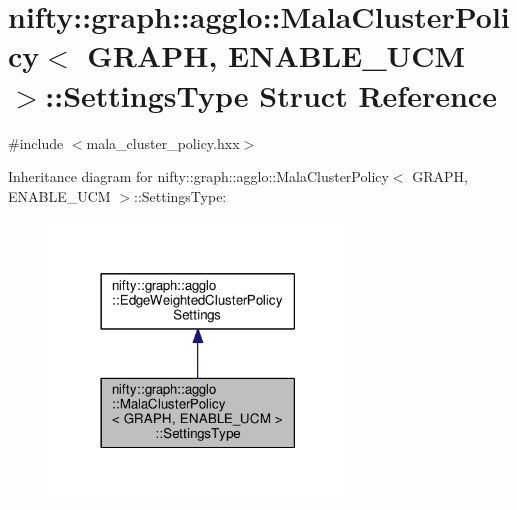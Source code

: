 \hypertarget{structnifty_1_1graph_1_1agglo_1_1MalaClusterPolicy_1_1SettingsType}{}\section{nifty\+:\+:graph\+:\+:agglo\+:\+:Mala\+Cluster\+Policy$<$ G\+R\+A\+P\+H, E\+N\+A\+B\+L\+E\+\_\+\+U\+C\+M $>$\+:\+:Settings\+Type Struct Reference}
\label{structnifty_1_1graph_1_1agglo_1_1MalaClusterPolicy_1_1SettingsType}


{\ttfamily \#include $<$mala\+\_\+cluster\+\_\+policy.\+hxx$>$}



Inheritance diagram for nifty\+:\+:graph\+:\+:agglo\+:\+:Mala\+Cluster\+Policy$<$ G\+R\+A\+P\+H, E\+N\+A\+B\+L\+E\+\_\+\+U\+C\+M $>$\+:\+:Settings\+Type\+:\nopagebreak
\begin{figure}[H]
\begin{center}
\leavevmode
\includegraphics[width=225pt]{structnifty_1_1graph_1_1agglo_1_1MalaClusterPolicy_1_1SettingsType__inherit__graph}
\end{center}
\end{figure}


